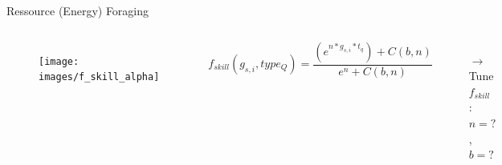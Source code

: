 \documentclass[8pt, handout=show,notes=show]{beamer}
\begin{document}
	\begin{frame}{Ressource (Energy) Foraging}\addtocounter{framenumber}{-1}
	
	
	
	
	
	\begin{columns} 
	
	
	
	\begin{figure}
	\texttt{[image: images/f\_skill\_alpha]}
	\end{figure}
	
	
	$$ f_{skill}(g_{s,i},type_Q)= {\frac{\left(e^{n*g_{s,i}*t_q}\right)+C(b,n)} {e^{n}+C(b,n)}}$$
	\begin{enumerate}
	\item[ $\rightarrow$] Tune $f_{skill}$ : $n=?$, $b=?$
	\end{enumerate}
	
	\end{columns}
	
	
	\end{frame}
	
\end{document}
